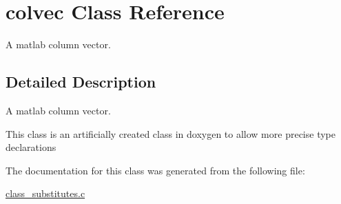 \hypertarget{classcolvec}{\section{colvec Class Reference}
\label{classcolvec}
}


A matlab column vector.  




\subsection{Detailed Description}
A matlab column vector. 

This class is an artificially created class in doxygen to allow more precise type declarations 

The documentation for this class was generated from the following file\-:\begin{DoxyCompactItemize}
\item 
\hyperlink{class__substitutes_8c}{class\-\_\-substitutes.\-c}\end{DoxyCompactItemize}
